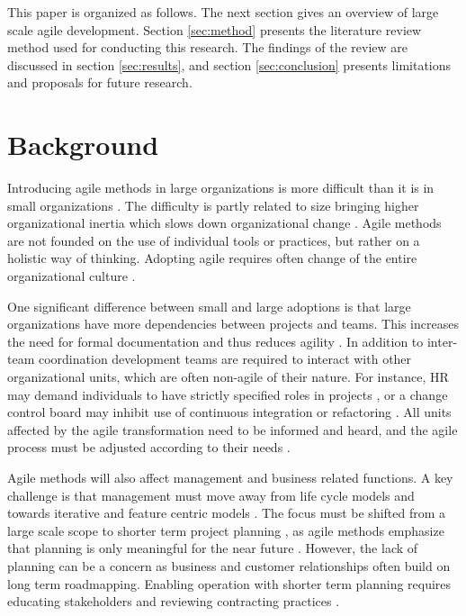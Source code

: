\documentclass[lnbip]{svmultln}
\begin{document}
This paper is organized as follows. The next section gives an overview of large
scale agile development. Section \ref{sec:method} presents the literature review
method used for conducting this research. The findings of the review are
discussed in section \ref{sec:results}, and section \ref{sec:conclusion}
presents limitations and proposals for future research.


\section{Background}
\label{sec:background}

Introducing agile methods in large organizations is more difficult than it is in
small organizations . The difficulty is partly related to size
bringing higher organizational inertia which slows down organizational change
. Agile methods are not founded on the use of individual
tools or practices, but rather on a holistic way of thinking.
Adopting agile requires often change of the entire organizational culture
.

One significant difference between small and large adoptions is that large
organizations have more dependencies between projects and teams. This increases
the need for formal documentation and thus reduces agility .
In addition to inter-team coordination development teams are required to
interact with other organizational units, which are often non-agile of their
nature. For instance, HR may demand individuals to have strictly specified roles
in projects , or a change control board may inhibit use of
continuous integration or refactoring . All units affected
by the agile transformation need to be informed and heard, and the agile process
must be adjusted according to their needs .

Agile methods will also affect management and business related functions. A key
challenge is that management must move away from life cycle models and towards
iterative and feature centric models . The focus must be
shifted from a large scale scope to shorter term project planning
, as agile methods emphasize that planning is only meaningful
for the near future . However, the lack of planning can be a
concern as business and customer relationships often build on long term
roadmapping. Enabling operation with shorter term planning requires educating
stakeholders and reviewing contracting practices .
\end{document}
